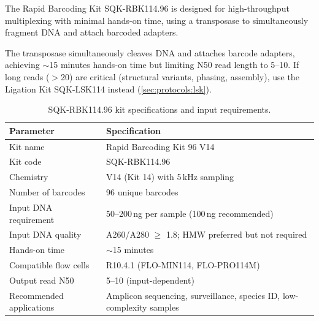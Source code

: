 The Rapid Barcoding Kit SQK-RBK114.96 is designed for high-throughput multiplexing with minimal hands-on time, using a transposase to simultaneously fragment DNA and attach barcoded adapters.

\begin{keyconcept}[title={Rapid Barcoding: Speed vs.\ Read Length}]
The transposase simultaneously cleaves DNA and attaches barcode adapters, achieving $\sim$15 minutes hands-on time but limiting N50 read length to 5--10\kilobase{}. If long reads ($>$20\kilobase{}) are critical (structural variants, phasing, assembly), use the Ligation Kit SQK-LSK114 instead (\cref{sec:protocols:lsk}).
\end{keyconcept}

\begin{table}[htbp]
\centering
\caption{SQK-RBK114.96 kit specifications and input requirements.}
\label{tab:protocols:rbk_specs}
\small
\renewcommand{\arraystretch}{1.3}
\begin{tabularx}{\textwidth}{@{}l X@{}}
\toprule
\textbf{Parameter} & \textbf{Specification} \\
\midrule
Kit name & Rapid Barcoding Kit 96 V14 \\
Kit code & SQK-RBK114.96 \\
Chemistry & V14 (Kit 14) with 5\,kHz sampling \\
Number of barcodes & 96 unique barcodes \\
Input DNA requirement & 50--200\,ng per sample (100\,ng recommended) \\
Input DNA quality & A260/A280 $\geq$ 1.8; HMW preferred but not required \\
Hands-on time & $\sim$15 minutes \\
Compatible flow cells & R10.4.1 (FLO-MIN114, FLO-PRO114M) \\
Output read N50 & 5--10\kilobase{} (input-dependent) \\
Recommended applications & Amplicon sequencing, surveillance, species ID, low-complexity samples \\
\bottomrule
\end{tabularx}
\end{table}

